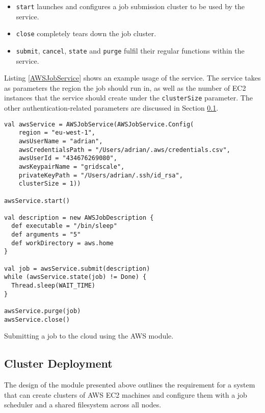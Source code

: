 \begin{itemize}
	\item \verb|start| launches and configures a job submission cluster to be used by the service.
	\item \verb|close| completely tears down the job cluster.
	\item \verb|submit|, \verb|cancel|, \verb|state| and \verb|purge| fulfil their regular functions within the service.
\end{itemize}

Listing \ref{AWSJobService} shows an example usage of the service. The service takes as parameters the region the job should run in, as well as the number of EC2 instances that the service should create under the \verb|clusterSize| parameter. The other authentication-related parameters are discussed in Section \ref{ClusterDeploymentSection}.

\begin{listing}[h]
	\centering
	\begin{minipage}{11.8cm}
		\begin{verbatim}
val awsService = AWSJobService(AWSJobService.Config(
    region = "eu-west-1",
    awsUserName = "adrian",
    awsCredentialsPath = "/Users/adrian/.aws/credentials.csv",
    awsUserId = "434676269080",
    awsKeypairName = "gridscale",
    privateKeyPath = "/Users/adrian/.ssh/id_rsa",
    clusterSize = 1))

awsService.start()

val description = new AWSJobDescription {
  def executable = "/bin/sleep"
  def arguments = "5"
  def workDirectory = aws.home
}

val job = awsService.submit(description)
while (awsService.state(job) != Done) {
  Thread.sleep(WAIT_TIME)
}

awsService.purge(job)
awsService.close()
		\end{verbatim}
	\end{minipage}
	\caption{Submitting a job to the cloud using the AWS module.}
	\label{AWSJobService}
\end{listing}

\vspace{-5mm}
\subsection{Cluster Deployment} \label{ClusterDeploymentSection}

The design of the module presented above outlines the requirement for a system that can create clusters of AWS EC2 machines and configure them with a job scheduler and a shared filesystem across all nodes.


